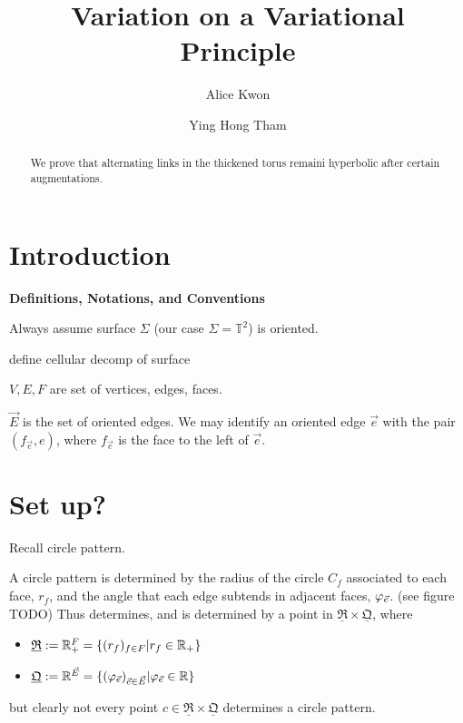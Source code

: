 \documentclass{amsart}
\newcommand{\torus}{{\mathbb{T}^2}}
\newcommand{\RRR}{{\underline{\mathfrak{R}}}}
\newcommand{\QQQ}{{\underline{\mathfrak{Q}}}}
\begin{document}
\title{Variation on a Variational Principle}
\author{Alice Kwon}
   \address{TODO SUNY Maritime address}
\author{Ying Hong Tham}
   \address{Department of Mathematics, Stony Brook University, 
            Stony Brook, NY 11794, USA}

\begin{abstract}
We prove that alternating links in the thickened torus remaini hyperbolic
after certain augmentations.
\end{abstract}
\maketitle

\section{Introduction}

\textbf{Definitions, Notations, and Conventions}

Always assume surface $\Sigma$ (our case $\Sigma = \torus$) is oriented.

define cellular decomp of surface

$V,E,F$ are set of vertices, edges, faces.

$\vec{E}$ is the set of oriented edges.
We may identify an oriented edge $\vec{e}$ with the pair $(f_{\vec{e}}, e)$,
where $f_{\vec{e}}$ is the face to the left of $\vec{e}$.


\section{Set up?}

Recall circle pattern.

A circle pattern is determined by the radius of the circle $C_f$ associated to each face, $r_f$,
and the angle that each edge subtends in adjacent faces, $\varphi_{\vec{e}}$. (see figure TODO)
Thus determines, and is determined by a point in $\RRR \times \QQQ$, where

\begin{itemize}
	\item $\RRR := \RR_+^F = \{(r_f)_{f\in F} | r_f \in \RR_+\}$
	\item $\QQQ := \RR^{\vec{E}} =
		\{(\vphi_{\vec{e}})_{\vec{e} \in \vec{E}} | \vphi_{\vec{e}} \in \RR\}$
\end{itemize}
but clearly not every point $c\in \RRR \times \QQQ$ determines a circle pattern.
\end{document}

